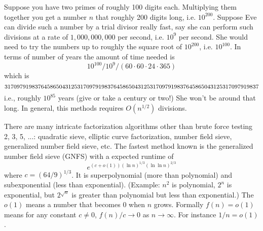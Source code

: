 Suppose you have two primes of roughly 100 digits each.
Multiplying them together you get a number $n$ that roughly 200 digits long, 
i.e. $10^{200}$.
Suppose Eve can divide such a number by a trial divisor really fast, say she 
can perform such divisions
at a rate of $1,000,000,000$ per second, i.e. $10^9$ per second.
She would need to try the numbers up to roughly the square root of $10^{200}$,
 i.e. $10^{100}$.
In terms of number of years the amount of time needed is
\[
10^{100} / 10^9 / (60 \cdot 60 \cdot 24 \cdot 365)
\]
which is
\[
{\scriptsize 317097919837645865043125317097919837645865043125317097919837645865043125317097919837}
\]
i.e., roughly $10^{85}$ years (give or take a century or two!)
She won't be around that long.
In general, this methods requires
$O(n^{1/2})$ divisions.

There are many intricate factorization algorithms
other than brute force testing 2, 3, 5, ...: quadratic
sieve, elliptic curve factorization, number field sieve,
generalized number field sieve, etc. 
The fastest method known is the generalized number field sieve (GNFS)
with a expected runtime of
\[
  e^{(c + o(1)) (\ln n)^{1/3} (\ln \ln n)^{2/3}}
\]
where $c = (64/9)^{1/3}$.
It is superpolynomial (more than polynomial)
and subexponential (less than exponential).
(Example:
$n^2$ is polynomial,
$2^n$ is exponential, 
but $2^{\sqrt{n}}$ is greater than polynomial
but less than exponential.)
The $o(1)$ means a number that becomes 0 when $n$ grows.
Formally $f(n) = o(1)$ means
for any constant $c \neq 0$,
$f(n)/c \rightarrow 0$ as $n \rightarrow \infty$.
For instance $1/n = o(1)$.

